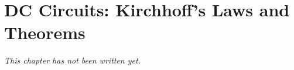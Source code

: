 \chapter{DC Circuits: Kirchhoff's Laws and Theorems}\label{ch:b1:dc-circuits}


\emph{This chapter has not been written yet.}
